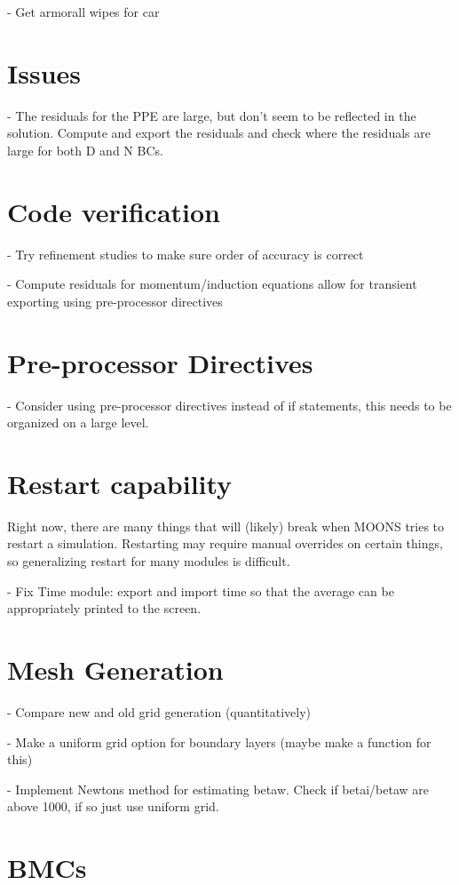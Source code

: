 \documentclass[11pt]{article}
\begin{document}
- Get armorall wipes for car

\section{Issues}

- The residuals for the PPE are large, but don't seem to be reflected in the solution. Compute and export the residuals and check where the residuals are large for both D and N BCs.

\section{Code verification}

- Try refinement studies to make sure order of accuracy is correct

- Compute residuals for momentum/induction equations allow for transient exporting using pre-processor directives

\section{Pre-processor Directives}
- Consider using pre-processor directives instead of if statements, this needs to be organized on a large level.

\section{Restart capability}
Right now, there are many things that will (likely) break when MOONS tries to restart a simulation. Restarting may require manual overrides on certain things, so generalizing restart for many modules is difficult.

- Fix Time module: export and import time so that the average can be appropriately
printed to the screen.



\section{Mesh Generation}

- Compare new and old grid generation (quantitatively)

- Make a uniform grid option for boundary layers (maybe make a function for this)

- Implement Newtons method for estimating betaw. Check if betai/betaw
are above 1000, if so just use uniform grid.


\section{BMCs}
\end{document}
